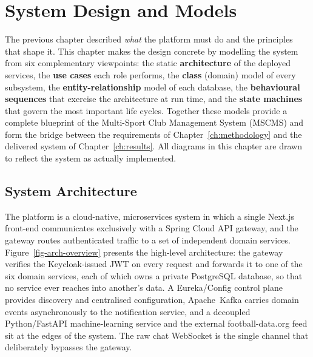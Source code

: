 \chapter{System Design and Models}
\label{ch:design}

The previous chapter described \emph{what} the platform must do and the
principles that shape it. This chapter makes the design concrete by modelling
the system from six complementary viewpoints: the static \textbf{architecture}
of the deployed services, the \textbf{use cases} each role performs, the
\textbf{class} (domain) model of every subsystem, the
\textbf{entity-relationship} model of each database, the \textbf{behavioural
sequences} that exercise the architecture at run time, and the \textbf{state
machines} that govern the most important life cycles. Together these models
provide a complete blueprint of the Multi-Sport Club Management System (MSCMS)
and form the bridge between the requirements of
Chapter~\ref{ch:methodology} and the delivered system of
Chapter~\ref{ch:results}. All diagrams in this chapter are drawn to reflect the
system as actually implemented.

\section{System Architecture}
\label{sec:design-arch}

The platform is a cloud-native, microservices system in which a single Next.js
front-end communicates exclusively with a Spring Cloud API gateway, and the
gateway routes authenticated traffic to a set of independent domain services.
Figure~\ref{fig-arch-overview} presents the high-level architecture: the gateway
verifies the Keycloak-issued JWT on every request and forwards it to one of the
six domain services, each of which owns a private PostgreSQL database, so that no
service ever reaches into another's data. A Eureka/Config control plane provides
discovery and centralised configuration, Apache~Kafka carries domain events
asynchronously to the notification service, and a decoupled Python/FastAPI
machine-learning service and the external football-data.org feed sit at the
edges of the system. The raw chat WebSocket is the single channel that
deliberately bypasses the gateway.

